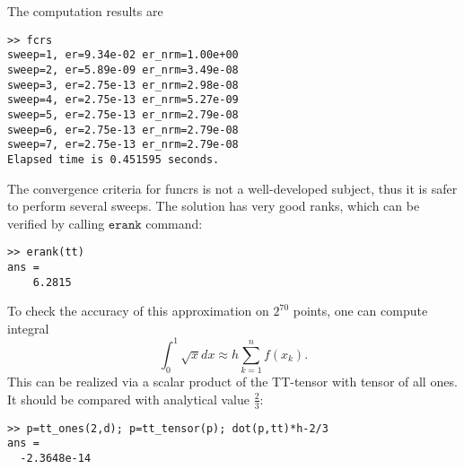 \documentclass[a4paper,12pt,twoside]{article}
\begin{document}
The computation results are
\begin{lstlisting}
>> fcrs
sweep=1, er=9.34e-02 er_nrm=1.00e+00 
sweep=2, er=5.89e-09 er_nrm=3.49e-08 
sweep=3, er=2.75e-13 er_nrm=2.98e-08 
sweep=4, er=2.75e-13 er_nrm=5.27e-09 
sweep=5, er=2.75e-13 er_nrm=2.79e-08 
sweep=6, er=2.75e-13 er_nrm=2.79e-08 
sweep=7, er=2.75e-13 er_nrm=2.79e-08 
Elapsed time is 0.451595 seconds.
\end{lstlisting}
The convergence criteria for funcrs is not a well-developed subject, thus it is safer to perform 
several sweeps.
The solution has very good ranks, which can be verified by calling $\texttt{erank}$ command:
\begin{lstlisting}
>> erank(tt)
ans =
    6.2815
\end{lstlisting}
To check the accuracy of this approximation on $2^{70}$ points, one can compute integral
$$\int_{0}^1 \sqrt{x} dx \approx h \sum_{k=1}^n f(x_k).$$
This can be realized via a scalar product of the TT-tensor with tensor of all ones.
It should be compared with analytical value $\frac{2}{3}$:
\begin{lstlisting}
>> p=tt_ones(2,d); p=tt_tensor(p); dot(p,tt)*h-2/3
ans =
  -2.3648e-14
\end{lstlisting}

%
\end{document}
